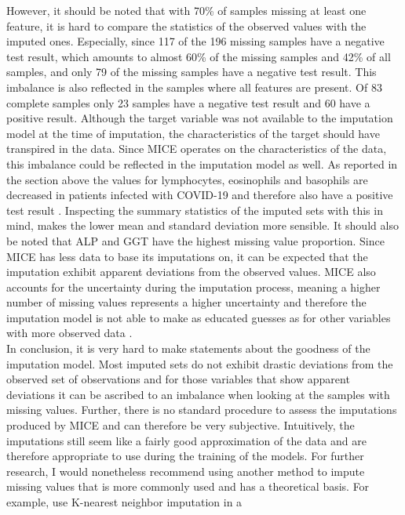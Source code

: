 However, it should be noted that with 70\% of samples missing at least one 
feature, it is hard to compare the statistics of the observed values with the 
imputed ones. Especially, since 117 of the 196 missing samples have a negative 
test result, which amounts to almost 60\% of the missing samples and 42\% of 
all samples, and only 79 of the missing samples have a negative test result. 
This imbalance is also reflected in the samples where all features are present. 
Of 83 complete samples only 23 samples have a negative test result and 60 have 
a positive result. Although the target variable was not available to the 
imputation model at the time of imputation, the characteristics of the target 
should have transpired in the data.
Since MICE operates on the characteristics of the data, this imbalance could be 
reflected in the imputation model as well. As 
reported in the section above the values for lymphocytes, eosinophils and 
basophils are decreased in patients infected with COVID-19 and therefore also 
have a positive test result \cite{RN162, RN181}. Inspecting the summary 
statistics of the 
imputed sets with this in mind, makes the lower mean and standard deviation 
more sensible.
It should also be noted that ALP and GGT have the highest missing value 
proportion. Since MICE has less data to base its imputations on, it can be 
expected that the imputation exhibit apparent deviations from the observed 
values. MICE also accounts for the uncertainty during the imputation process, 
meaning a higher number of missing values represents a higher uncertainty and 
therefore the imputation model is not able to make as educated guesses as for 
other variables with more observed data \cite{RN141, RN142}.
\\
In conclusion, it is very hard to make statements about the goodness of the 
imputation model. Most imputed sets do not exhibit drastic deviations from the 
observed set of observations and for those variables that show apparent 
deviations it can be ascribed to an imbalance when looking at the samples with 
missing values. Further, there is no standard procedure to assess the 
imputations produced by MICE and can therefore be very subjective. Intuitively, 
the imputations still seem like a fairly good approximation of the data and are 
therefore appropriate to use during the training of the models.
For further research, I would nonetheless recommend using another method to 
impute missing values that is more commonly used and has a theoretical basis. 
For example, \citeauthor{RN127} use K-nearest neighbor imputation in a 
